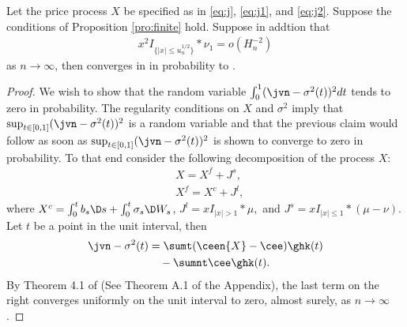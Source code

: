 \begin{prop}
  Let the price process  $X$ be specified as in  \eqref{eq:j}, \eqref{eq:j1}, and \eqref{eq:j2}. 
  Suppose the conditions of Proposition \eqref{pro:finite} hold. Suppose in addtion that 
  \begin{align}
    x^2 I_{\{\vert x \vert \le u_n^{1/2}\}} \ast \nu_1 = o(H_n^{-2})
    \label{eq:smallo}
  \end{align}
  as $n \to \infty$, then \jvn converges in \Ltwo in probability to \sv.
\end{prop}
\begin{proof}
  We wish to show that the random variable
  $\int_0^1 (\jvn - \sigma^2(t))^2dt$ tends to zero in probability. The regularity conditions on $X$ and $\sigma^2$ imply that  $\sup_{t \in [0,1]} (\jvn - \sigma^2(t))^2$ is a random variable and that the previous claim would follow as soon as $\sup_{t \in [0,1]} (\jvn - \sigma^2(t))^2$ is shown  to converge to  zero in probability.  To that end consider the following decomposition of the process $X$:
  \begin{align}
    &X = X^f + J^s\label{eq:xj},\\
    &X^f = X^c + J^l\label{eq:xjc},
  \end{align}
  where 
    $X^c = \int^t_0 b_s \D s + \int^t_0 \sigma_s \D W_s$, 
    $J^l = xI_{\vert x \vert > 1} \ast \mu,$
    and $J^s = xI_{\vert x \vert \le  1} \ast (\mu - \nu)$.
    Let $t$ be a point in the unit interval, then 
    \begin{align}
      \jvn -  \sigma^2(t) &= \sumt (\ceen{X} - \cee) \ghk(t)\notag \\
& \quad - \sumnt \cee \ghk(t).
      \label{eq:open}
    \end{align}
    By Theorem 4.1 of \cite{Zhang2008} (See Theorem A.1 of the Appendix), the last term on the right converges uniformly  on the unit  interval  to zero, almost surely, as $n \to \infty$. 
    

\end{proof}
